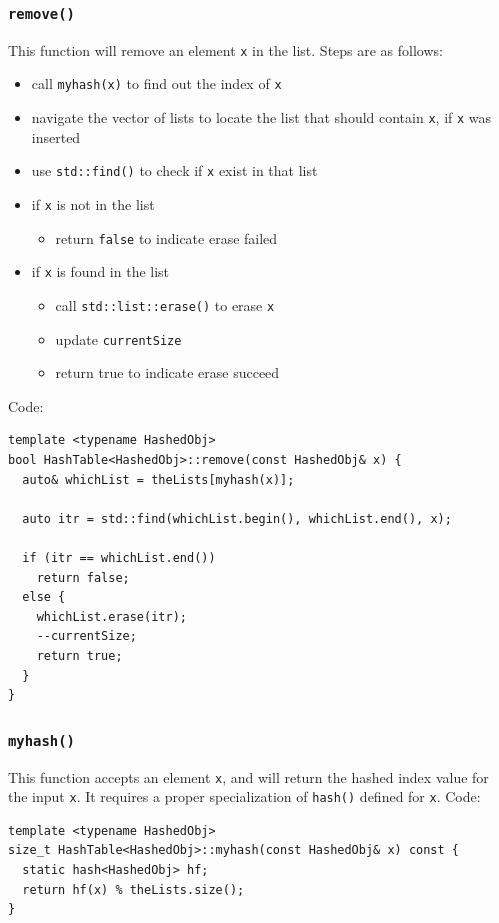 \documentclass[11pt]{book}
\begin{document}
\subsubsection{\texttt{remove()}}
\label{sec:org1f75400}
This function will remove an element \texttt{x} in the list. Steps are as follows:
\begin{itemize}
\item call \texttt{myhash(x)} to find out the index of \texttt{x}
\item navigate the vector of lists to locate the list that should contain \texttt{x}, if \texttt{x} was inserted
\item use \texttt{std::find()} to check if \texttt{x} exist in that list
\item if \texttt{x} is not in the list
\begin{itemize}
\item return \texttt{false} to indicate erase failed
\end{itemize}
\item if \texttt{x} is found in the list
\begin{itemize}
\item call \texttt{std::list::erase()} to erase \texttt{x}
\item update \texttt{currentSize}
\item return true to indicate erase succeed
\end{itemize}
\end{itemize}

Code:
\begin{verbatim}
template <typename HashedObj>
bool HashTable<HashedObj>::remove(const HashedObj& x) {
  auto& whichList = theLists[myhash(x)];

  auto itr = std::find(whichList.begin(), whichList.end(), x);

  if (itr == whichList.end())
    return false;
  else {
    whichList.erase(itr);
    --currentSize;
    return true;
  }
}
\end{verbatim}

\subsubsection{\texttt{myhash()}}
\label{sec:orgffbeb74}
This function accepts an element \texttt{x}, and will return the hashed index value for the input \texttt{x}. It requires a proper specialization of \texttt{hash()} defined for \texttt{x}. Code:
\begin{verbatim}
template <typename HashedObj>
size_t HashTable<HashedObj>::myhash(const HashedObj& x) const {
  static hash<HashedObj> hf;
  return hf(x) % theLists.size();
}
\end{verbatim}
\end{document}
